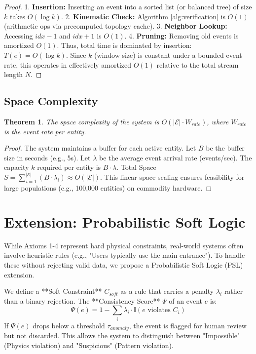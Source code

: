 \documentclass[conference]{IEEEtran}
\newtheorem{theorem}{Theorem}
\begin{document}
\begin{proof}
1. \textbf{Insertion:} Inserting an event into a sorted list (or balanced tree) of size $k$ takes $O(\log k)$.
2. \textbf{Kinematic Check:} Algorithm \ref{alg:verification} is $O(1)$ (arithmetic ops via precomputed topology cache).
3. \textbf{Neighbor Lookup:} Accessing $idx-1$ and $idx+1$ is $O(1)$.
4. \textbf{Pruning:} Removing old events is amortized $O(1)$.
Thus, total time is dominated by insertion: $T(e) = O(\log k)$. Since $k$ (window size) is constant under a bounded event rate, this operates in effectively amortized $O(1)$ relative to the total stream length $N$.
\end{proof}

\subsection{Space Complexity}

\begin{theorem}
The space complexity of the system is $O(|\mathcal{E}| \cdot W_{rate})$, where $W_{rate}$ is the event rate per entity.
\end{theorem}

\begin{proof}
The system maintains a buffer for each active entity.
Let $B$ be the buffer size in seconds (e.g., 5s).
Let $\lambda$ be the average event arrival rate (events/sec).
The capacity $k$ required per entity is $B \cdot \lambda$.
Total Space $S = \sum_{i=1}^{|\mathcal{E}|} (B \cdot \lambda_i) \approx O(|\mathcal{E}|)$.
This linear space scaling ensures feasibility for large populations (e.g., 100,000 entities) on commodity hardware.
\end{proof}

\section{Extension: Probabilistic Soft Logic}
While Axioms 1-4 represent hard physical constraints, real-world systems often involve heuristic rules (e.g., "Users typically use the main entrance"). To handle these without rejecting valid data, we propose a Probabilistic Soft Logic (PSL) extension.

We define a **Soft Constraint** $C_{soft}$ as a rule that carries a penalty $\lambda_i$ rather than a binary rejection. The **Consistency Score** $\Psi$ of an event $e$ is:
\begin{equation}
    \Psi(e) = 1 - \sum_{i} \lambda_i \cdot \mathbb{I}(e \text{ violates } C_i)
\end{equation}
If $\Psi(e)$ drops below a threshold $\tau_{anomaly}$, the event is flagged for human review but not discarded. This allows the system to distinguish between "Impossible" (Physics violation) and "Suspicious" (Pattern violation).
\end{document}
